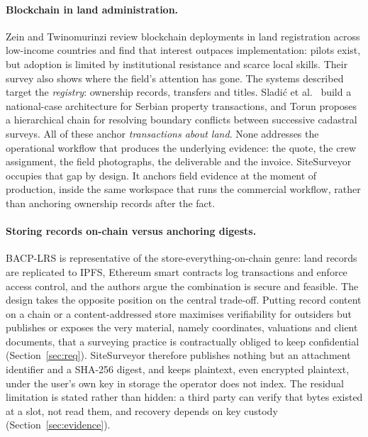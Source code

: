 \documentclass[10pt,a4paper,twocolumn]{article}
\begin{document}
\paragraph{Blockchain in land administration.}
Zein and Twinomurinzi \cite{zein2023} review blockchain deployments in land registration
across low-income countries and find that interest outpaces implementation: pilots exist,
but adoption is limited by institutional resistance and scarce local skills. Their survey
also shows where the field's attention has gone. The systems described target the
\emph{registry}: ownership records, transfers and titles. Sladi\'c et al.~\cite{sladic2021}
build a national-case architecture for Serbian property transactions, and Torun
\cite{torun2018} proposes a hierarchical chain for resolving boundary conflicts between
successive cadastral surveys. All of these anchor \emph{transactions about land}. None
addresses the operational workflow that produces the underlying evidence: the quote, the
crew assignment, the field photographs, the deliverable and the invoice. SiteSurveyor
occupies that gap by design. It anchors field evidence at the moment of production,
inside the same workspace that runs the commercial workflow, rather than anchoring
ownership records after the fact.

\paragraph{Storing records on-chain versus anchoring digests.}
BACP-LRS \cite{boumezbeur2025} is representative of the store-everything-on-chain genre:
land records are replicated to IPFS, Ethereum smart contracts log transactions and enforce
access control, and the authors argue the combination is secure and feasible. The design
takes the opposite position on the central trade-off. Putting record content on a chain or
a content-addressed store maximises verifiability for outsiders but publishes or exposes
the very material, namely coordinates, valuations and client documents, that a surveying practice
is contractually obliged to keep confidential (Section~\ref{sec:req}). SiteSurveyor
therefore publishes nothing but an attachment identifier and a SHA-256 digest, and keeps
plaintext, even encrypted plaintext, under the user's own key in storage the operator does
not index. The residual limitation is stated rather than hidden: a third party can verify
that bytes existed at a slot, not read them, and recovery depends on key custody
(Section~\ref{sec:evidence}).
\end{document}
